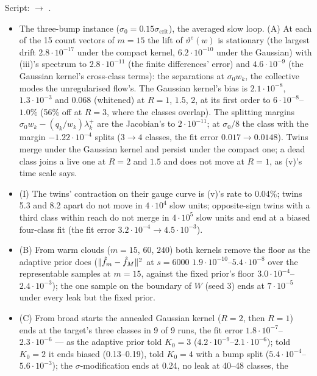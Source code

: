 Script:  $\to$ .
\begin{itemize}
  \item The three-bump instance ($\sigma_0=0.15\sigma_{\mathrm{crit}}$), the averaged slow loop. (A) At each of the 15
    count vectors of $m=15$ the lift of $\vartheta^e(w)$ is stationary (the largest drift $2.8\cdot10^{-17}$ under the
    compact kernel, $6.2\cdot10^{-10}$ under the Gaussian) with (iii)'s spectrum to $2.8\cdot10^{-11}$ (the finite
    differences' error) and $4.6\cdot10^{-9}$ (the Gaussian kernel's cross-class terms): the separations at
    $\sigma_0w_k$, the collective modes the unregularised flow's. The Gaussian kernel's bias is $2.1\cdot10^{-8}$,
    $1.3\cdot10^{-3}$ and 0.068 (whitened) at $R=1$, $1.5$, $2$, at its first order to $6\cdot10^{-8}$--$1.0\%$ (56\%
    off at $R=3$, where the classes overlap). The splitting margins $\sigma_0w_k-(q_k/w_k)\lambda^+_k$ are the
    Jacobian's to $2\cdot10^{-11}$; at $\sigma_0/8$ the class with the margin $-1.22\cdot10^{-4}$ splits ($3\to4$
    classes, the fit error $0.017\to0.0148$). Twins merge under the Gaussian kernel and persist under the compact
    one; a dead class joins a live one at $R=2$ and $1.5$ and does not move at $R=1$, as (v)'s time scale says.
  \item (I) The twins' contraction on their gauge curve is (v)'s rate to 0.04\%; twins 5.3 and 8.2 apart do not move
    in $4\cdot10^4$ slow units; opposite-sign twins with a third class within reach do not merge in $4\cdot10^5$ slow
    units and end at a biased four-class fit (the fit error $3.2\cdot10^{-4}\to4.5\cdot10^{-3}$).
  \item (B) From warm clouds ($m=15$, $60$, $240$) both kernels remove the floor as the adaptive prior does
    ($\lVert \hat f_m-\hat f_M\rVert^2$ at $s=6000$ $1.9\cdot10^{-10}$--$5.4\cdot10^{-8}$ over the representable samples at
    $m=15$, against the fixed prior's floor $3.0\cdot10^{-4}$--$2.4\cdot10^{-3}$); the one sample on the boundary of
    $W$ (seed 3) ends at $7\cdot10^{-5}$ under every leak but the fixed prior.
  \item (C) From broad starts the annealed Gaussian kernel ($R=2$, then $R=1$) ends at the target's three classes in 9
    of 9 runs, the fit error $1.8\cdot10^{-7}$--$2.3\cdot10^{-6}$ --- as the adaptive prior told $K_0=3$
    ($4.2\cdot10^{-9}$--$2.1\cdot10^{-6}$); told $K_0=2$ it ends biased (0.13--0.19), told $K_0=4$ with a bump split
    ($5.4\cdot10^{-4}$--$5.6\cdot10^{-3}$); the $\sigma$-modification ends at 0.24, no leak at 40--48 classes, the

\end{itemize}

